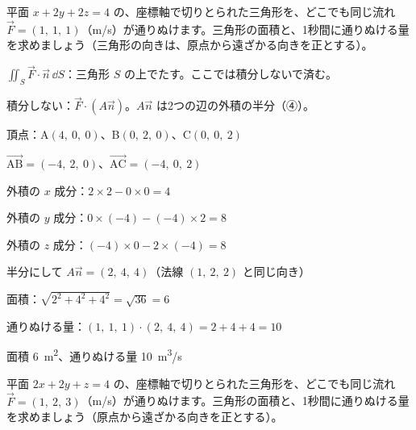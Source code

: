 \begin{reidai}
平面 $x+2y+2z=4$ の、座標軸で切りとられた三角形を、どこでも同じ流れ $\vec F=(1,\ 1,\ 1)$（m/s）が通りぬけます。三角形の面積と、1秒間に通りぬける量を求めましょう（三角形の向きは、原点から遠ざかる向きを正とする）。\par
\kangaekata {}\par
{}\enspace $\displaystyle\iint_S\vec F\cdot\vec n\,\dd S$：三角形 $S$ の上でたす。ここでは積分しないで済む。\par
{}\enspace 積分しない：$\vec F\cdot(A\vec n)$。$A\vec n$ は2つの辺の外積の半分（④）。\par
\shiki\kviiiis{}\zw{} 頂点：A$(4,\ 0,\ 0)$、B$(0,\ 2,\ 0)$、C$(0,\ 0,\ 2)$\par
\kviiiia $\overrightarrow{\mathrm{AB}}=(-4,\ 2,\ 0)$、$\overrightarrow{\mathrm{AC}}=(-4,\ 0,\ 2)$\par
\kviiiia 外積の $x$ 成分：$2\times2-0\times0=4$\par
\kviiiia 外積の $y$ 成分：$0\times(-4)-(-4)\times2=8$\par
\kviiiia 外積の $z$ 成分：$(-4)\times0-2\times(-4)=8$\par
\kviiiia 半分にして $A\vec n=(2,\ 4,\ 4)$（法線 $(1,\ 2,\ 2)$ と同じ向き）\par
\kviiiia 面積：$\sqrt{2^2+4^2+4^2}=\sqrt{36}=6$\par
\kviiiia 通りぬける量：$(1,\ 1,\ 1)\cdot(2,\ 4,\ 4)=2+4+4=10$\par
\kotae\kviiiis{}\zw{} 面積 \qty{6}{m^2}、通りぬける量 \qty{10}{m^3/s}
\end{reidai}

\begin{jibun}
平面 $2x+2y+z=4$ の、座標軸で切りとられた三角形を、どこでも同じ流れ $\vec F=(1,\ 2,\ 3)$（m/s）が通りぬけます。三角形の面積と、1秒間に通りぬける量を求めましょう（原点から遠ざかる向きを正とする）。
\end{jibun}

